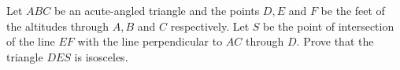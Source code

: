 Let $ABC$ be an acute-angled triangle and the points $D,E$ and $F$ be the feet of the
altitudes through $A,B$ and $C$ respectively. Let $S$ be the point of intersection of
the line $EF$ with the line perpendicular to $AC$ through $D$.
Prove that the triangle $DES$ is isosceles.